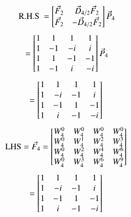 \documentclass[journal,12pt,twocolumn]{IEEEtran}
\renewcommand\thesection{\arabic{section}}
\begin{document}
\begin{enumerate}[label=\thesection.\arabic*
	,ref=\thesection.\theenumi]
\begin{enumerate}[label=\arabic*.,ref=\thesection.\theenumi]
\begin{equation}
	\text{R.H.S } = 
	\begin{bmatrix}
		\vec{F}_{2} & \vec{D}_{4/2} \vec{F}_{2}\\
		\vec{F}_{2} & -\vec{D}_{4/2} \vec{F}_{2}\\
	\end{bmatrix}\vec{P}_{4}\\
\end{equation}
\begin{equation}
	=\begin{bmatrix}
		1	&	1	&	1	&	1\\
		1	&	-1	&	-i	&	i\\
		1	&	1	&	-1	&	-1\\
		1	&	-1	&	i	&	-i\\
	\end{bmatrix}\vec{P}_{4}\\
\end{equation}
\begin{equation}
	=\begin{bmatrix}
		1	&	1	&	1	&	1\\
		1	&	-i	&	-1	&	i\\
		1	&	-1	&	1	&	-1\\
		1	&	i	&	-1	&	-i\\
	\end{bmatrix}\\
\end{equation}
\begin{equation}
	\text{LHS} = \vec{F}_{4}
	= \begin{bmatrix}
		W_{4}^0	&	W_{4}^0	&	W_{4}^0	&	W_{4}^0\\
		W_{4}^0	&	W_{4}^1	&	W_{4}^2	&	W_{4}^3\\
		W_{4}^0	&	W_{4}^2	&	W_{4}^4	&	W_{4}^6\\
		W_{4}^0	&	W_{4}^3	&	W_{4}^6	&	W_{4}^9\\
	\end{bmatrix}\\
\end{equation}
\begin{equation}
	= \begin{bmatrix}
		1	&	1	&	1	&	1\\
		1	&	-i	&	-1	&	i\\
		1	&	-1	&	1	&	-1\\
		1	&	i	&	-1	&	-i\\
	\end{bmatrix}\\
\end{equation}

\end{enumerate}
\end{enumerate}
\end{document}
